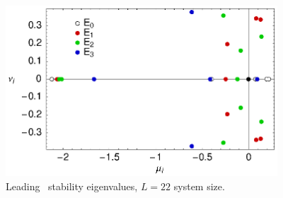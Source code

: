 \begin{figure}[t]
\begin{center}
\includegraphics[width=4in]{figs/L22-eqvaEigenvalues.eps}
\end{center}
\caption{
Leading  \eqv\ stability eigenvalues,
$L=22$ system size.
}
\label{f:KS22EkEigs}
\end{figure}

